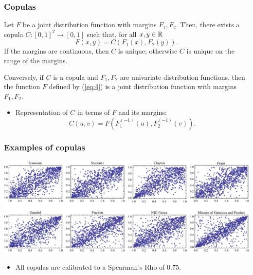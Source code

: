 \documentclass[10pt,mathserif,notes=show]{beamer}
\renewcommand{\(}{\begin{columns}}
\renewcommand{\)}{\end{columns}}
\newcommand{\<}[1]{\begin{column}{#1}}
\renewcommand{\>}{\end{column}}
\theoremstyle{definition}
\begin{document}
\begin{frame}
  \frametitle{Copulas}
  \begin{theorem}
  Let $F$ be a joint distribution function with margins $F_1,
  F_2$. Then, there exists a copula $C:[0,1]^2\rightarrow[0,1]$ such
  that, for all $x,y\in {\mathbb{R}}$
  \begin{equation}
    \label{eq:4}
    F(x,y)=C(F_1(x), F_2(y)). 
  \end{equation}
  If the margins are continuous, then $C$ is unique; otherwise $C$ is
  unique on the range of the margins.

  Conversely, if $C$ is a copula and $F_1, F_2$ are univariate
  distribution functions, then the function $F$ defined by (\ref{eq:4})
  is a joint distribution function with margins $F_1, F_2$.
\end{theorem}
\begin{itemize}
  \addtolength{\itemsep}{1pt}
\item Representation of $C$ in terms of $F$ and its
  margins: 
  \begin{equation*}
    C(u,v) = F(F_1^{(-1)}(u), F_2^{(-1)}(v)). 
  \end{equation*}
  \vspace*{-1.1\baselineskip}
\end{itemize}
\end{frame}

\begin{frame}[label=copulas]
  \frametitle{Examples of copulas}
  \hspace*{-.75cm}\includegraphics[scale=.65]{../_pics/copulas_scatterplots.pdf}
  \begin{itemize}
  \item All copulas are calibrated to a Spearman's Rho of 0.75.
  \end{itemize}
\end{frame}

\end{document}
